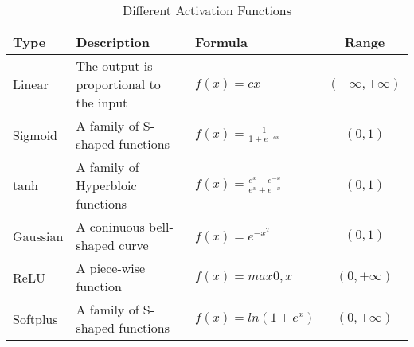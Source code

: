 \begin{table}
\centering
\caption{Different Activation Functions}
\begin{adjustbox}{width=1\textwidth}
\label{tab:transfer_function}
	\begin{tabular}{lllc}
			\toprule
			Type & Description  & Formula & Range  \\
			\midrule
			Linear   & The output is proportional to the input & $f(x)=cx$                  &  $(-\infty, +\infty)$ \\
			Sigmoid  & A family of S-shaped functions          & $f(x)=\frac{1}{1+e^{-cx}}$ & $(0, 1)$ \\
			tanh     & A family of Hyperbloic functions        & $f(x)=\frac{e^x -e^{-x}}{e^x+e^{-x}}$ & $(0, 1)$ \\
			Gaussian & A coninuous bell-shaped curve           & $f(x)=e^{-x^2}$            & $(0,1)$ \\ 
			ReLU     & A piece-wise function                   & $f(x)= max{0,x}$           & $(0, +\infty)$ \\
			Softplus & A family of S-shaped functions          & $f(x) = ln(1+e^x)$         & $(0, +\infty)$ \\
			\bottomrule
	\end{tabular}
\end{adjustbox}
\end{table}
